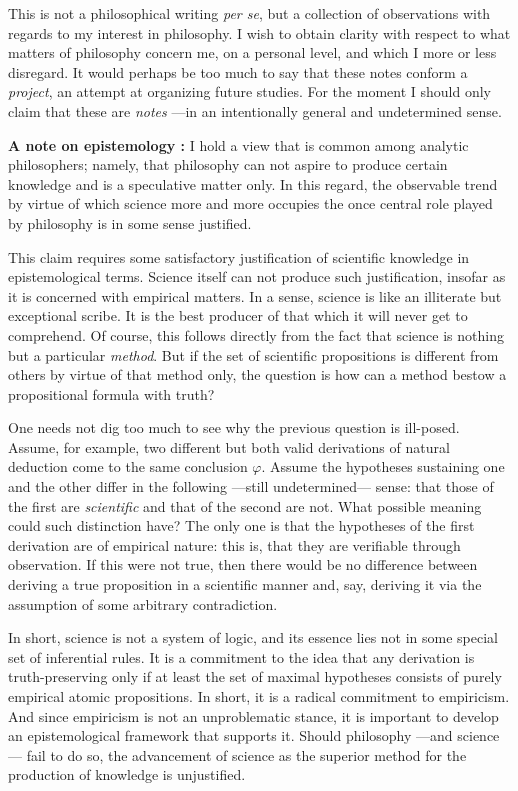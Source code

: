\documentclass[a4paper]{article}
\begin{document}
This is not a philosophical writing \textit{per se}, but a collection of
observations with regards to my interest in philosophy. I wish to obtain
clarity with respect to what matters of philosophy concern me, on a personal
level, and which I more or less disregard. It would perhaps be too much to
say that these notes conform a \textit{project}, an attempt at organizing
future studies. For the moment I should only claim that these are
\textit{notes} ---in an intentionally general and undetermined sense.

\textbf{A note on epistemology : } I hold a view that is common among analytic
philosophers; namely, that philosophy can not aspire to produce certain
knowledge and is a speculative matter only. In this regard, the observable trend
by virtue of which science more and more occupies the once central role played
by philosophy is in some sense justified. 

This claim requires some satisfactory justification of scientific knowledge in
epistemological terms. Science itself can not produce such justification,
insofar as it is concerned with empirical matters. In a sense, science is like
an illiterate but exceptional scribe. It is the best producer of that which it
will never get to comprehend. Of course, this follows directly from the fact
that science is nothing but a particular \textit{method}. But if the set of
scientific propositions is different from others by virtue of that method only,
the question is how can a method bestow a propositional formula with truth?

One needs not dig too much to see why the previous question is ill-posed.
Assume, for example, two different but both valid derivations of natural
deduction come to the same conclusion $\varphi$. Assume the hypotheses
sustaining one and the other differ in the following ---still undetermined---
sense: that those of the first are \textit{scientific} and that of the second
are not. What possible meaning could such distinction have? The only one is that
the hypotheses of the first derivation are of empirical nature: this is, that
they are verifiable through observation. If this were not true, then there would
be no difference between deriving a true proposition in a scientific manner
and, say, deriving it via the assumption of some arbitrary contradiction.

In short, science is not a system of logic, and its essence lies not in some
special set of inferential rules. It is a commitment to the idea that any
derivation is truth-preserving only if at least the set of maximal hypotheses
consists of purely empirical atomic propositions. In short, it is a radical
commitment to empiricism. And since empiricism is not an unproblematic stance,
it is important to develop an epistemological framework that supports it. Should
philosophy ---and science--- fail to do so, the advancement of science as the
superior method for the production of knowledge is unjustified.
\end{document}
